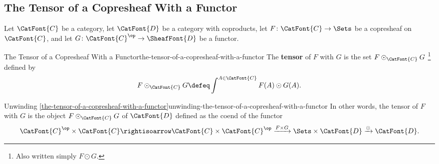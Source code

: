 \subsection{The Tensor of a Copresheaf With a Functor}\label{subsection-the-tensor-of-a-copresheaf-with-a-functor}
Let $\CatFont{C}$ be a category, let $\CatFont{D}$ be a category with coproducts, let $F\colon\CatFont{C}\to\Sets$ be a copresheaf on $\CatFont{C}$, and let $G\colon\CatFont{C}^{\op}\to\SheafFont{D}$ be a functor.
\begin{definition}{The Tensor of a Copresheaf With a Functor}{the-tensor-of-a-copresheaf-with-a-functor}%
    The \textbf{tensor} of $F$ with $G$ is the set $F\odot_{\CatFont{C}}G$%
    \footnote{%
        Also written simply $F\odot G$.
        \par\vspace*{-1.75\baselineskip}
    } %
    defined by
    \[
        F\odot_{\CatFont{C}}G%
        \defeq%
        \int^{A\in\CatFont{C}}F(A)\odot G(A).%
    \]%
\end{definition}
\begin{remark}{Unwinding \cref{the-tensor-of-a-copresheaf-with-a-functor}}{unwinding-the-tensor-of-a-copresheaf-with-a-functor}%
    In other words, the tensor of $F$ with $G$ is the object $F\odot_{\CatFont{C}}G$ of $\CatFont{D}$ defined as the coend of the functor
    \[
        \CatFont{C}^{\op}\times\CatFont{C}%
        \rightisoarrow%
        \CatFont{C}\times\CatFont{C}^{\op}%
        \xrightarrow{F\times G}%
        \Sets\times\CatFont{D}%
        \xrightarrow{\odot}%
        \CatFont{D}.%
    \]%
\end{remark}
